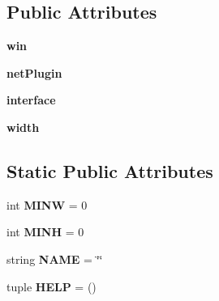 \subsection*{\-Public \-Attributes}
\begin{DoxyCompactItemize}
\item 
\hypertarget{classplugins_1_1plugin_1_1_curses_plugin_a3103a9de7bd546901cc8d7a3dce0ab21}{{\bfseries win}}\label{classplugins_1_1plugin_1_1_curses_plugin_a3103a9de7bd546901cc8d7a3dce0ab21}

\item 
\hypertarget{classplugins_1_1plugin_1_1_curses_plugin_a4ef84b72273f12712ff36b7b6a2c5b58}{{\bfseries net\-Plugin}}\label{classplugins_1_1plugin_1_1_curses_plugin_a4ef84b72273f12712ff36b7b6a2c5b58}

\item 
\hypertarget{classplugins_1_1plugin_1_1_curses_plugin_a12b63d1fbcd2c3da0a8175a7bf5fda47}{{\bfseries interface}}\label{classplugins_1_1plugin_1_1_curses_plugin_a12b63d1fbcd2c3da0a8175a7bf5fda47}

\item 
\hypertarget{classplugins_1_1plugin_1_1_curses_plugin_a776b6d2b58afa9f4fa0ac78c954d7a8e}{{\bfseries width}}\label{classplugins_1_1plugin_1_1_curses_plugin_a776b6d2b58afa9f4fa0ac78c954d7a8e}

\end{DoxyCompactItemize}
\subsection*{\-Static \-Public \-Attributes}
\begin{DoxyCompactItemize}
\item 
\hypertarget{classplugins_1_1plugin_1_1_curses_plugin_a96e814f68492e1cebbc7f958dac39b18}{int {\bfseries \-M\-I\-N\-W} = 0}\label{classplugins_1_1plugin_1_1_curses_plugin_a96e814f68492e1cebbc7f958dac39b18}

\item 
\hypertarget{classplugins_1_1plugin_1_1_curses_plugin_a1a544956a9b29a11e9b939204a19dd11}{int {\bfseries \-M\-I\-N\-H} = 0}\label{classplugins_1_1plugin_1_1_curses_plugin_a1a544956a9b29a11e9b939204a19dd11}

\item 
\hypertarget{classplugins_1_1plugin_1_1_curses_plugin_a8281f47102eff4b69a42b082bbf2f649}{string {\bfseries \-N\-A\-M\-E} = \char`\"{}\char`\"{}}\label{classplugins_1_1plugin_1_1_curses_plugin_a8281f47102eff4b69a42b082bbf2f649}

\item 
\hypertarget{classplugins_1_1plugin_1_1_curses_plugin_ae01c2507e4c26e606768979d40036b5c}{tuple {\bfseries \-H\-E\-L\-P} = ()}\label{classplugins_1_1plugin_1_1_curses_plugin_ae01c2507e4c26e606768979d40036b5c}

\end{DoxyCompactItemize}


